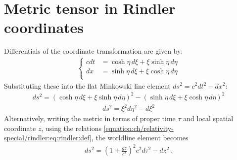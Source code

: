 \documentclass[letterpaper,10pt,english]{jupyterBook}
\begin{document}
\section{Metric tensor in Rindler coordinates}
\label{\detokenize{ch/relativity-special/rindler:metric-tensor-in-rindler-coordinates}}\label{\detokenize{ch/relativity-special/rindler:relativity-special-rindler-construction-metric-tensor}}
\sphinxAtStartPar
Differentials of the coordinate transformation are given by:
\begin{equation*}
\begin{split}\left\{ \begin{aligned}
  c dt & = \cosh\eta \, d\xi + \xi \sinh\eta \, d\eta \\
  dx   & = \sinh\eta \, d\xi + \xi \cosh\eta \, d\eta \\
\end{aligned}\right.\end{split}
\end{equation*}
\sphinxAtStartPar
Substituting these into the flat Minkowski line element \(ds^2 = c^2 dt^2 - dx^2\):
\begin{equation*}
\begin{split}ds^2 = (\cosh\eta \, d\xi + \xi \sinh\eta \, d\eta)^2 - (\sinh\eta \, d\xi + \xi \cosh\eta \, d\eta)^2\end{split}
\end{equation*}\begin{equation*}
\begin{split}ds^2 = \xi^2 d\eta^2 - d\xi^2\end{split}
\end{equation*}
\sphinxAtStartPar
Alternatively, writing the metric in terms of proper time \(\tau\) and local spatial coordinate \(z\), using the relations \eqref{equation:ch/relativity-special/rindler:eq:rindler:def}, the worldline element becomes
\begin{equation*}
\begin{split}ds^2 = \left(1 + \frac{gz}{c^2}\right)^2 c^2 d\tau^2 - dz^2 \ .\end{split}
\end{equation*}
\end{document}
